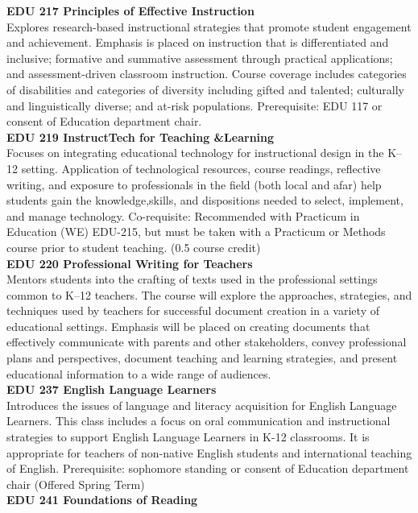 \documentclass[
  letterpaper,
]{scrbook}
\begin{document}
\textbf{EDU 217 Principles of Effective Instruction}\\
Explores research-based instructional strategies that promote student
engagement and achievement. Emphasis is placed on instruction that is
differentiated and inclusive; formative and summative assessment through
practical applications; and assessment-driven classroom instruction.
Course coverage includes categories of disabilities and categories of
diversity including gifted and talented; culturally and linguistically
diverse; and at-risk populations. Prerequisite: EDU 117 or consent of
Education department chair.\\
\textbf{EDU 219 InstructTech for Teaching \&Learning}\\
Focuses on integrating educational technology for instructional design
in the K--12 setting. Application of technological resources, course
readings, reflective writing, and exposure to professionals in the field
(both local and afar) help students gain the knowledge,skills, and
dispositions needed to select, implement, and manage technology.
Co-requisite: Recommended with Practicum in Education (WE) EDU-215, but
must be taken with a Practicum or Methods course prior to student
teaching. (0.5 course credit)\\
\textbf{EDU 220 Professional Writing for Teachers}\\
Mentors students into the crafting of texts used in the professional
settings common to K--12 teachers. The course will explore the
approaches, strategies, and techniques used by teachers for successful
document creation in a variety of educational settings. Emphasis will be
placed on creating documents that effectively communicate with parents
and other stakeholders, convey professional plans and perspectives,
document teaching and learning strategies, and present educational
information to a wide range of audiences.\\
\textbf{EDU 237 English Language Learners}\\
Introduces the issues of language and literacy acquisition for English
Language Learners. This class includes a focus on oral communication and
instructional strategies to support English Language Learners in K-12
classrooms. It is appropriate for teachers of non-native English
students and international teaching of English. Prerequisite: sophomore
standing or consent of Education department chair (Offered Spring
Term)\\
\textbf{EDU 241 Foundations of Reading}\\
\end{document}
